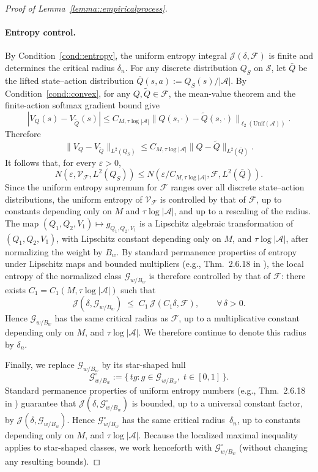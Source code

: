 \documentclass{article}
\theoremstyle{plain}
\theoremstyle{definition}
\theoremstyle{remark}
\begin{document}
\begin{proof}[Proof of Lemma~\ref{lemma::empiricalprocess}]
\paragraph{Entropy control.}
By Condition~\ref{cond::entropy}, the uniform entropy integral
$\mathcal{J}(\delta,\mathcal F)$ is finite and determines the
critical radius $\delta_n$.
For any discrete distribution $Q_S$ on $\mathcal S$, let
$\bar Q$ be the lifted state--action distribution
$\bar Q(s,a):=Q_S(s)/|\mathcal A|$.  By Condition~\ref{cond::convex}, for any
$Q,\widetilde Q\in\mathcal F$, the mean-value theorem and the finite-action
softmax gradient bound give
\[
\left|V_Q(s)-V_{\widetilde Q}(s)\right|
\le
C_{M,\tau\log|\mathcal A|}
\|Q(s,\cdot)-\widetilde Q(s,\cdot)\|_{\ell_2(\mathrm{Unif}(\mathcal A))}.
\]
Therefore
\[
\|V_Q-V_{\widetilde Q}\|_{L^2(Q_S)}
\le
C_{M,\tau\log|\mathcal A|}
\|Q-\widetilde Q\|_{L^2(\bar Q)}.
\]
It follows that, for every $\varepsilon>0$,
\[
N(\varepsilon,\mathcal V_{\mathcal F},L^2(Q_S))
\le
N(\varepsilon/C_{M,\tau\log|\mathcal A|},
  \mathcal F,L^2(\bar Q)).
\]
Since the uniform entropy supremum for $\mathcal F$ ranges over all discrete
state--action distributions, the uniform entropy of $\mathcal V_{\mathcal F}$
is controlled by that of $\mathcal F$, up to constants depending only on
$M$ and \(\tau\log|\mathcal A|\), and up to a rescaling of the radius.
The map $(Q_1,Q_2,V_1)\mapsto g_{Q_1,Q_2,V_1}$ is a Lipschitz algebraic
transformation of $(Q_1,Q_2,V_1)$, with Lipschitz constant depending
only on \(M\), and \(\tau\log|\mathcal A|\), after normalizing the
weight by \(B_w\).
By standard permanence properties of entropy under Lipschitz maps and bounded
multipliers (e.g., Thm.~2.6.18 in \cite{van1996weak}), the local entropy of
the normalized class $\mathcal G_{w/B_w}$ is therefore controlled by that of
$\mathcal F$: there exists
$C_1=C_1(M,\tau\log|\mathcal A|)$ such that
\[
\mathcal{J}(\delta,\mathcal G_{w/B_w})
\;\le\;
C_1\,\mathcal{J}(C_1\delta,\mathcal F),
\qquad \forall\,\delta>0.
\]
Hence $\mathcal G_{w/B_w}$ has the same critical radius as $\mathcal F$, up to a
multiplicative constant depending only on
\(M\), and \(\tau\log|\mathcal A|\).
We therefore continue to denote this radius by $\delta_n$.

Finally, we replace $\mathcal G_{w/B_w}$ by its star-shaped hull
\[
\mathcal G_{w/B_w}^\circ
:= \{\, t g : g \in \mathcal G_{w/B_w},\; t \in [0,1] \,\}.
\]
Standard permanence properties of uniform entropy numbers
(e.g., Thm.~2.6.18 in \cite{van1996weak}) guarantee that
$\mathcal{J}(\delta,\mathcal G_{w/B_w}^\circ)$ is bounded, up to a universal
constant factor, by $\mathcal{J}(\delta,\mathcal G_{w/B_w})$.  Hence
$\mathcal G_{w/B_w}^\circ$ has the same critical radius~$\delta_n$, up to
constants depending only on \(M\), and \(\tau\log|\mathcal A|\). Because the localized maximal inequality
applies to star-shaped classes, we work henceforth with $\mathcal G_{w/B_w}^\circ$
(without changing any resulting bounds).


\end{proof}
\end{document}
